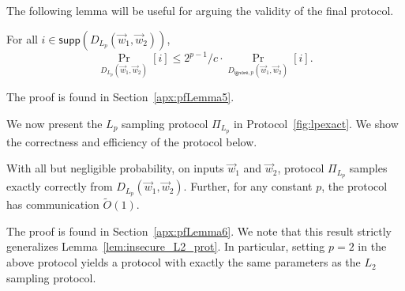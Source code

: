 The following lemma will be useful for arguing the validity of the
final protocol.

\begin{lemma} \label{lem:close_dist_2}
For all $i \in \mathsf{supp}(D_{L_p}(\vec{w}_1, \vec{w}_2))$, 
$$\Pr_{D_{L_p}(\vec{w}_1, \vec{w}_2)}[i] \leq 2^{p-1}/c \cdot \Pr_{D_{\mathsf{ignore}, p}(\vec{w}_1, \vec{w}_2)}[i].$$
\end{lemma}

The proof is found in Section~\ref{apx:pfLemma5}.

We now present the $L_p$ sampling protocol $\Pi_{L_p}$ in Protocol~\ref{fig:lpexact}. We show the correctness and efficiency of the protocol below. 


\begin{lemma} \label{lem:lp}
With all but negligible probability, on inputs $\vec{w}_1$ and $\vec{w}_2$, protocol $\Pi_{L_p}$ samples exactly correctly from $D_{L_p}(\vec{w}_1, \vec{w}_2)$.
Further, for any constant $p$, the protocol has communication
$\tilde{O}(1)$.
\end{lemma}

The proof is found in Section~\ref{apx:pfLemma6}.
We note that this result strictly generalizes
Lemma~\ref{lem:insecure_L2_prot}.
In particular, setting $p=2$ in the above
protocol yields a protocol with exactly the 
same parameters as the $L_2$ sampling protocol.

